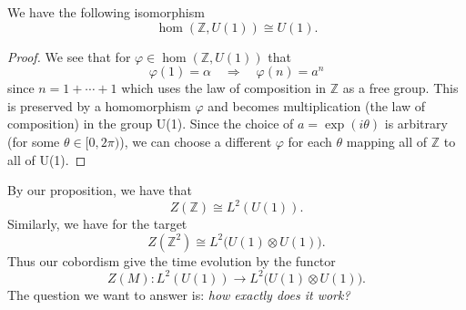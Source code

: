\begin{prop}%
We have the following isomorphism
\begin{equation}%
\hom(\mathbb{Z},U(1))\cong U(1).
\end{equation}
\end{prop}
\begin{proof}
We see that for $\varphi\in\hom(\mathbb{Z},U(1))$ that
\begin{equation}%
\varphi(1)=\alpha\quad\Rightarrow\quad \varphi(n)=a^{n}
\end{equation}
since $n=1+\cdots+1$ which uses the law of composition in
$\mathbb{Z}$ as a free group. This is preserved by a homomorphism
$\varphi$ and becomes multiplication (the law of composition) in
the group U(1). Since the choice of $a=\exp(i\theta)$ is
arbitrary (for some $\theta\in[0,2\pi)$), we can choose a
  different $\varphi$ for each $\theta$ mapping all of
  $\mathbb{Z}$ to all of U(1).
\end{proof}

By our proposition, we have that
\begin{equation}%
Z(\mathbb{Z})\cong L^{2}(U(1)).
\end{equation}
Similarly, we have for the target
\begin{equation}%
Z(\mathbb{Z}^{2})\cong L^{2}\Big(U(1)\otimes U(1)\Big).
\end{equation}
Thus our cobordism give the time evolution by the functor
\begin{equation}%
Z(M): L^{2}(U(1))\to L^{2}\Big(U(1)\otimes U(1)\Big).
\end{equation}
The question we want to answer is: \emph{how exactly does it
  work?}

